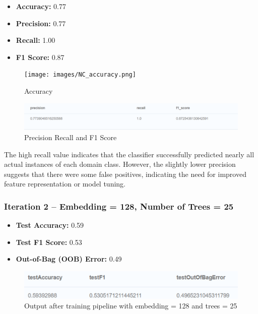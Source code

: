 \documentclass[conference, 12pt]{IEEEtran}
\begin{document}
\begin{itemize}
  \item \textbf{Accuracy:} 0.77
  \item \textbf{Precision:} 0.77
  \item \textbf{Recall:} 1.00
  \item \textbf{F1 Score:} 0.87
\end{itemize}

\begin{figure}[h]
    \centering
    \texttt{[image: images/NC\_accuracy.png]} %
    \caption{Accuracy}
    \label{fig:accuracy}
\end{figure}

\begin{figure}[h]
    \centering
    \includegraphics[width=\linewidth]{images/NC_precision_recall_f1score.png} %
    \caption{Precision Recall and F1 Score}
    \label{fig:NC_Precision_Recall}
\end{figure}

The high recall value indicates that the classifier successfully predicted nearly all actual instances of each domain class. However, the slightly lower precision suggests that there were some false positives, indicating the need for improved feature representation or model tuning.

\subsubsection{Iteration 2 -- Embedding = 128, Number of Trees = 25}

\begin{itemize}
  \item \textbf{Test Accuracy:} 0.59
  \item \textbf{Test F1 Score:} 0.53
  \item \textbf{Out-of-Bag (OOB) Error:} 0.49
\end{itemize}

\begin{figure}[h]
  \centering
  \includegraphics[width=\linewidth]{images/NC_model_training_output_2.png} 
  \caption{Output after training pipeline with embedding = 128 and trees = 25}
  \label{fig:classification_metrics_2}
\end{figure}
\end{document}
